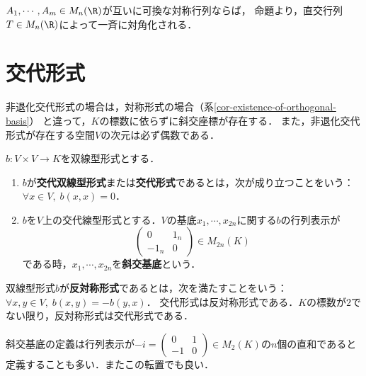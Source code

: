 \documentclass[uplatex, dvipdfmx]{jsreport}
\begin{document}
\begin{example}[対称行列の一斉対角化]
    $A_1,\cdots,A_m\in M_n(\R)$が互いに可換な対称行列ならば，
    命題より，直交行列$T\in M_n(\R)$によって一斉に対角化される．
\end{example}

\section{交代形式}

\begin{tcolorbox}[colframe=ForestGreen, colback=ForestGreen!10!white, breakable]
    非退化交代形式の場合は，対称形式の場合（系\ref{cor-existence-of-orthogonal-basis}）
    と違って，$K$の標数に依らずに斜交座標が存在する．
    また，非退化交代形式が存在する空間$V$の次元は必ず偶数である．
\end{tcolorbox}

\begin{definition}
    $b:V\times V\to K$を双線型形式とする．
    \begin{enumerate}
        \item $b$が\textbf{交代双線型形式}または\textbf{交代形式}であるとは，次が成り立つことをいう：$\forall x\in V,\;b(x,x)=0$．
        \item $b$を$V$上の交代線型形式とする．$V$の基底$x_1,\cdots,x_{2n}$に関する$b$の行列表示が
        \[\begin{pmatrix}0&1_n\\-1_n&0\end{pmatrix}\in M_{2n}(K)\]
        である時，$x_1,\cdots,x_{2n}$を\textbf{斜交基底}という．
    \end{enumerate}
\end{definition}

\begin{remark}
    双線型形式$b$が\textbf{反対称形式}であるとは，次を満たすことをいう：$\forall x,y\in V,\;b(x,y)=-b(y,x)$．
    交代形式は反対称形式である．$K$の標数が$2$でない限り，反対称形式は交代形式である．
\end{remark}

\begin{remark}[斜交基底の定義]
    斜交基底の定義は行列表示が$-i=\begin{pmatrix}0&1\\-1&0\end{pmatrix}\in M_2(K)$の$n$個の直和であると定義することも多い．またこの転置でも良い．
\end{remark}
\end{document}
